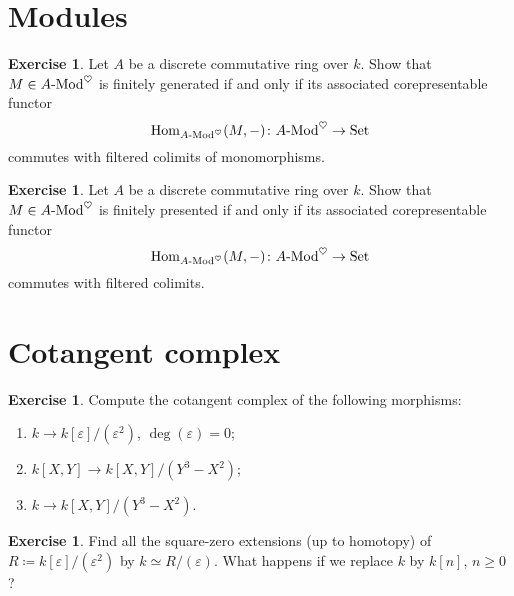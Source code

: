 \documentclass[10pt,a4paper,reqno,oneside]{book} %
\theoremstyle{plain}
\theoremstyle{definition}
\newtheorem{exercise}[thm]{Exercise}
\theoremstyle{remark}
\numberwithin{equation}{section}
\begin{document}
\section{Modules}

\begin{exercise}
	Let $A$ be a discrete commutative ring over $k$.
	Show that $M \in A\textrm{-}\mathrm{Mod}^\heartsuit$ is finitely generated if and only if its associated corepresentable functor
	\[ \operatorname{Hom}_{A\textrm{-}\mathrm{Mod}^\heartsuit}(M,-) \colon A \textrm{-}\mathrm{Mod}^\heartsuit \to \mathrm{Set} \]
	commutes with filtered colimits of monomorphisms.
\end{exercise}

\begin{exercise}
	Let $A$ be a discrete commutative ring over $k$.
	Show that $M \in A \textrm{-}\mathrm{Mod}^\heartsuit$ is finitely presented if and only if its associated corepresentable functor
	\[ \operatorname{Hom}_{A\textrm{-}\mathrm{Mod}^\heartsuit}(M,-) \colon A \textrm{-}\mathrm{Mod}^\heartsuit \to \mathrm{Set} \]
	commutes with filtered colimits.
\end{exercise}

\section{Cotangent complex}

\begin{exercise}
\label{ex:cotangent_comp}
	Compute the cotangent complex of the following morphisms:
	\begin{enumerate}
		\item $k \to k[\varepsilon] / (\varepsilon^2)$, $\deg(\varepsilon) = 0$;
		\item $k[X,Y] \to k[X,Y] / (Y^3 - X^2)$;
		\item $k \to k[X,Y] / (Y^3 - X^2)$.
	\end{enumerate}
\end{exercise}

\begin{exercise}
	Find all the square-zero extensions (up to homotopy) of $R \coloneqq k[\varepsilon] / (\varepsilon^2)$ by $k \simeq R / (\varepsilon)$.
	What happens if we replace $k$ by $k[n]$, $n \ge 0$?
\end{exercise}
\end{document}
